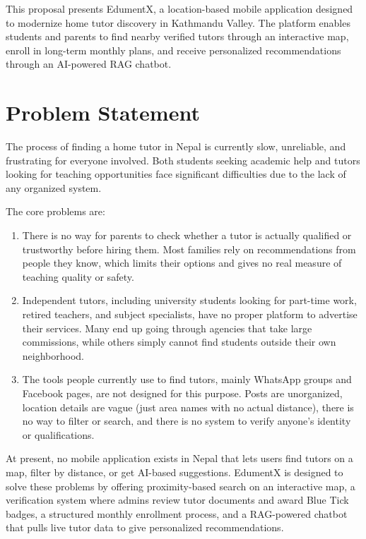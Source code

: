 \documentclass[12pt]{report}
\begin{document}
\noindent This proposal presents EdumentX, a location-based mobile application designed to modernize home tutor discovery in Kathmandu Valley. The platform enables students and parents to find nearby verified tutors through an interactive map, enroll in long-term monthly plans, and receive personalized recommendations through an AI-powered RAG chatbot.

\section{Problem Statement}

The process of finding a home tutor in Nepal is currently slow, unreliable, and frustrating for everyone involved. Both students seeking academic help and tutors looking for teaching opportunities face significant difficulties due to the lack of any organized system.

\noindent The core problems are:

{\renewcommand{\labelenumi}{(\roman{enumi})}
\begin{enumerate}
\item There is no way for parents to check whether a tutor is actually qualified or trustworthy before hiring them. Most families rely on recommendations from people they know, which limits their options and gives no real measure of teaching quality or safety.

\item Independent tutors, including university students looking for part-time work, retired teachers, and subject specialists, have no proper platform to advertise their services. Many end up going through agencies that take large commissions, while others simply cannot find students outside their own neighborhood.

\item The tools people currently use to find tutors, mainly WhatsApp groups and Facebook pages, are not designed for this purpose. Posts are unorganized, location details are vague (just area names with no actual distance), there is no way to filter or search, and there is no system to verify anyone's identity or qualifications.
\end{enumerate}
}

\noindent At present, no mobile application exists in Nepal that lets users find tutors on a map, filter by distance, or get AI-based suggestions. EdumentX is designed to solve these problems by offering proximity-based search on an interactive map, a verification system where admins review tutor documents and award Blue Tick badges, a structured monthly enrollment process, and a RAG-powered chatbot that pulls live tutor data to give personalized recommendations.
\end{document}
